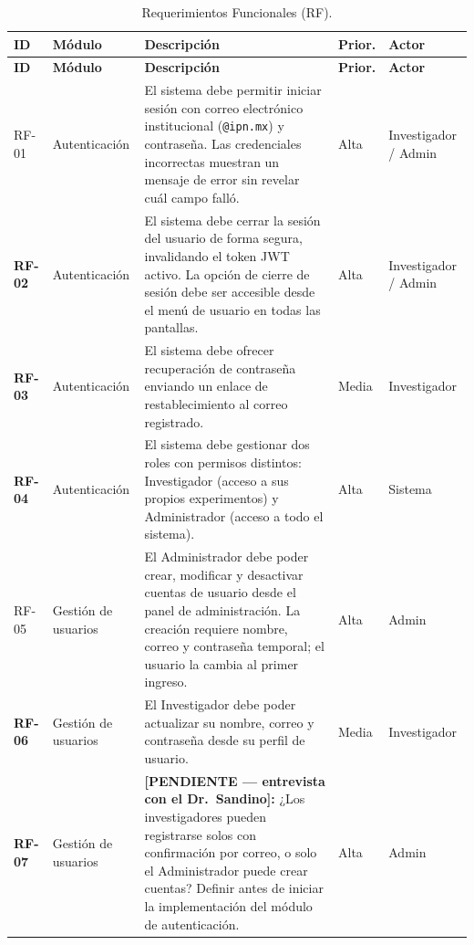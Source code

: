 \begin{longtable}{|>{\bfseries}p{1.1cm}|p{2.0cm}|p{6.7cm}|p{1.3cm}|p{1.7cm}|}
\caption{Requerimientos Funcionales (RF).
\label{tab:rf}}\\
\hline
\textbf{ID} & \textbf{Módulo} & \textbf{Descripción} & \textbf{Prior.} & \textbf{Actor} \\
\hline
\endfirsthead
\hline
\textbf{ID} & \textbf{Módulo} & \textbf{Descripción} & \textbf{Prior.} & \textbf{Actor} \\
\hline
\endhead
\hline
\endfoot

RF-01 & Autenticación
      & El sistema debe permitir iniciar sesión con correo electrónico institucional
        (\texttt{@ipn.mx}) y contraseña. Las credenciales incorrectas muestran
        un mensaje de error sin revelar cuál campo falló.
      & Alta & Investigador / Admin \\
\hline
RF-02 & Autenticación
      & El sistema debe cerrar la sesión del usuario de forma segura, invalidando
        el token JWT activo. La opción de cierre de sesión debe ser accesible desde
        el menú de usuario en todas las pantallas.
      & Alta & Investigador / Admin \\
\hline
RF-03 & Autenticación
      & El sistema debe ofrecer recuperación de contraseña enviando un enlace de
        restablecimiento al correo registrado.
      & Media & Investigador \\
\hline
RF-04 & Autenticación
      & El sistema debe gestionar dos roles con permisos distintos: Investigador
        (acceso a sus propios experimentos) y Administrador (acceso a todo el sistema).
      & Alta & Sistema \\
\hline

RF-05 & Gestión de usuarios
      & El Administrador debe poder crear, modificar y desactivar cuentas de usuario
        desde el panel de administración. La creación requiere nombre, correo y
        contraseña temporal; el usuario la cambia al primer ingreso.
      & Alta & Admin \\
\hline
RF-06 & Gestión de usuarios
      & El Investigador debe poder actualizar su nombre, correo y contraseña desde
        su perfil de usuario.
      & Media & Investigador \\
\hline
RF-07 & Gestión de usuarios
      & \textbf{[PENDIENTE — entrevista con el Dr.\ Sandino]:} ¿Los
        investigadores pueden registrarse solos con confirmación por correo, o solo
        el Administrador puede crear cuentas? Definir antes de iniciar
        la implementación del módulo de autenticación.
      & Alta & Admin \\
\hline


\end{longtable}
